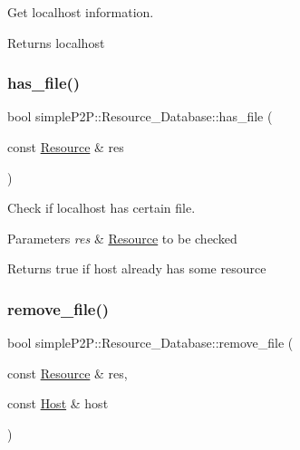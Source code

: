 Get localhost information. 

\begin{DoxyReturn}{Returns}
localhost 
\end{DoxyReturn}
\mbox{\label{classsimpleP2P_1_1Resource__Database_a2a6cd0b6da11176aec9ef7f218ac1c62}} 
\subsubsection{\texorpdfstring{has\+\_\+file()}{has\_file()}}
{\footnotesize\ttfamily bool simple\+P2\+P\+::\+Resource\+\_\+\+Database\+::has\+\_\+file (\begin{DoxyParamCaption}\item[{const \hyperlink{classsimpleP2P_1_1Resource}{Resource} \&}]{res }\end{DoxyParamCaption})}



Check if localhost has certain file. 


\begin{DoxyParams}{Parameters}
{\em res} & \hyperlink{classsimpleP2P_1_1Resource}{Resource} to be checked \\
\hline
\end{DoxyParams}
\begin{DoxyReturn}{Returns}
true if host already has some resource 
\end{DoxyReturn}
\mbox{\label{classsimpleP2P_1_1Resource__Database_a9b0fe1012eba333db6d8e99b02764d4d}} 
\subsubsection{\texorpdfstring{remove\+\_\+file()}{remove\_file()}\hspace{0.1cm}{\footnotesize\ttfamily [1/2]}}
{\footnotesize\ttfamily bool simple\+P2\+P\+::\+Resource\+\_\+\+Database\+::remove\+\_\+file (\begin{DoxyParamCaption}\item[{const \hyperlink{classsimpleP2P_1_1Resource}{Resource} \&}]{res,  }\item[{const \hyperlink{classsimpleP2P_1_1Host}{Host} \&}]{host }\end{DoxyParamCaption})}



